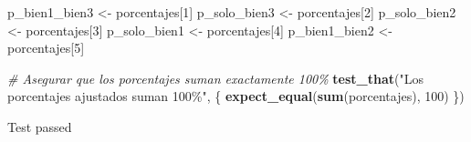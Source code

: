 \documentclass[
]{article}
\newenvironment{Shaded}{\begin{snugshade}}{\end{snugshade}}
\newcommand{\CommentTok}[1]{\textcolor[rgb]{0.56,0.35,0.01}{\textit{#1}}}
\newcommand{\DecValTok}[1]{\textcolor[rgb]{0.00,0.00,0.81}{#1}}
\newcommand{\FunctionTok}[1]{\textcolor[rgb]{0.13,0.29,0.53}{\textbf{#1}}}
\newcommand{\NormalTok}[1]{#1}
\newcommand{\OtherTok}[1]{\textcolor[rgb]{0.56,0.35,0.01}{#1}}
\newcommand{\StringTok}[1]{\textcolor[rgb]{0.31,0.60,0.02}{#1}}
\begin{document}
\begin{Shaded}
\begin{Highlighting}[]
\NormalTok{p\_bien1\_bien3 }\OtherTok{\textless{}{-}}\NormalTok{ porcentajes[}\DecValTok{1}\NormalTok{]}
\NormalTok{p\_solo\_bien3 }\OtherTok{\textless{}{-}}\NormalTok{ porcentajes[}\DecValTok{2}\NormalTok{]}
\NormalTok{p\_solo\_bien2 }\OtherTok{\textless{}{-}}\NormalTok{ porcentajes[}\DecValTok{3}\NormalTok{]}
\NormalTok{p\_solo\_bien1 }\OtherTok{\textless{}{-}}\NormalTok{ porcentajes[}\DecValTok{4}\NormalTok{]}
\NormalTok{p\_bien1\_bien2 }\OtherTok{\textless{}{-}}\NormalTok{ porcentajes[}\DecValTok{5}\NormalTok{]}

\CommentTok{\# Asegurar que los porcentajes suman exactamente 100\%}
\FunctionTok{test\_that}\NormalTok{(}\StringTok{"Los porcentajes ajustados suman 100\%"}\NormalTok{, \{}
  \FunctionTok{expect\_equal}\NormalTok{(}\FunctionTok{sum}\NormalTok{(porcentajes), }\DecValTok{100}\NormalTok{)}
\NormalTok{\})}
\end{Highlighting}
\end{Shaded}

Test passed
\end{document}
